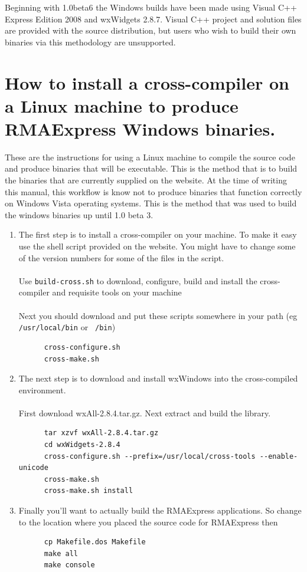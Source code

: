 \documentclass[11pt]{report}
\begin{document}
Beginning with 1.0beta6 the Windows builds have been made using Visual C++ Express Edition 2008 and wxWidgets 2.8.7. Visual C++ project and solution files are provided with the source distribution, but users who wish to build their own binaries via this methodology are unsupported.

\section{How to install a cross-compiler on a Linux machine to produce RMAExpress Windows binaries.}
These are the instructions for using a Linux machine to compile the source code and produce binaries that will be executable. This is the method that is to build the binaries that are currently supplied on the website. At the time of writing this manual, this workflow is know not to produce binaries that function correctly on Windows Vista operating systems. This is the method that was used to build the windows binaries up until 1.0 beta 3. 
\begin{enumerate}
\item The first step is to install a cross-compiler on your machine. To make it easy use the shell script provided on the website. You might have to change some of the version numbers for some of the files in the script.
\\ \\
      Use {\tt build-cross.sh} to download, configure, build and install the cross-compiler and requisite tools on your machine
\\ \\
      Next you should download and put these scripts somewhere in your path (eg {\tt /usr/local/bin} or {\tt ~/bin})
\begin{verbatim}
      cross-configure.sh
      cross-make.sh
\end{verbatim}
\item The next step is to download and install wxWindows into the cross-compiled environment.
\\ \\
      First download wxAll-2.8.4.tar.gz. Next extract and build the library.
\begin{verbatim}
      tar xzvf wxAll-2.8.4.tar.gz
      cd wxWidgets-2.8.4
      cross-configure.sh --prefix=/usr/local/cross-tools --enable-unicode
      cross-make.sh
      cross-make.sh install
\end{verbatim}
\item Finally you'll want to actually build the RMAExpress applications. So change to the location where you placed the source code for RMAExpress then
\begin{verbatim}
      cp Makefile.dos Makefile
      make all
      make console 
\end{verbatim}
\end{enumerate}
\end{document}
